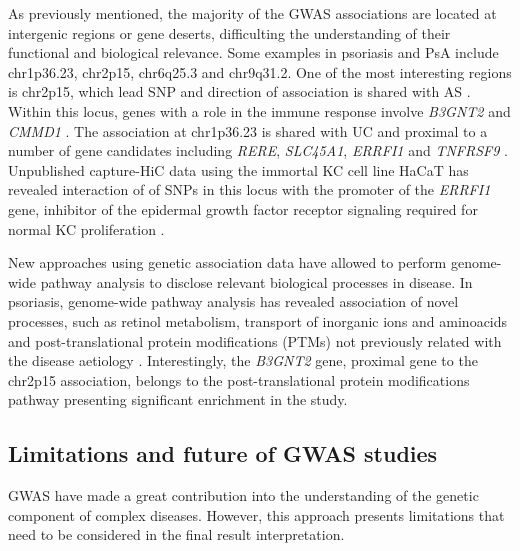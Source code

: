 As previously mentioned, the majority of the GWAS associations are located at intergenic regions or gene deserts, difficulting the understanding of their functional and biological relevance. Some examples in psoriasis and PsA include chr1p36.23, chr2p15, chr6q25.3 and chr9q31.2. One of the most interesting regions is chr2p15, which lead SNP and direction of association is shared with AS \parencite{Immunobase}. Within this locus, genes with a role in the immune response involve \textit{B3GNT2} and \textit{CMMD1} \parencite{Maine2007, Tsoi2012}. 
The association at chr1p36.23 is shared with UC and proximal to a number of gene candidates including \textit{RERE}, \textit{SLC45A1}, \textit{ERRFI1} and \textit{TNFRSF9} \parencite{Tsoi2012}. Unpublished capture-HiC data using the immortal KC cell line  HaCaT has revealed interaction of of SNPs in this locus with the promoter of the \textit{ERRFI1} gene, inhibitor of the epidermal growth factor receptor signaling required for normal KC proliferation \parencite{Ray-Jones2017}. %

New approaches using genetic association data have allowed to perform genome-wide pathway analysis to disclose relevant biological processes in disease. %
In psoriasis, genome-wide pathway analysis has revealed association of novel processes, such as retinol metabolism, transport of inorganic ions and aminoacids and post-translational protein modifications (PTMs) not previously related with the disease aetiology \parencite{Aterido2015}. Interestingly, the \textit{B3GNT2} gene, proximal gene to the chr2p15 association, belongs to the post-translational protein modifications pathway presenting significant enrichment in the study. 

  

\subsection{Limitations and future of GWAS studies}

GWAS have made a great contribution into the understanding of the genetic component of complex diseases. However, this approach presents limitations that need to be considered in the final result interpretation. 

